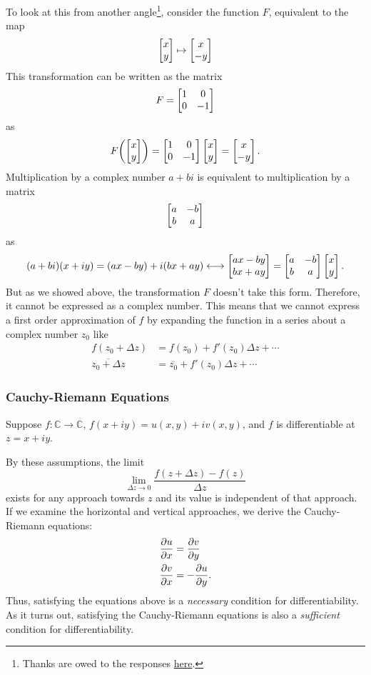 \documentclass[10pt]{scrartcl}
\numberwithin{equation}{subsection}
\theoremstyle{definition}
\theoremstyle{remark}
\newcommand{\Complex}{\mathbb{C}}
\newcommand*{\conjugate}[1]{\overline{#1}}
\begin{document}
To look at this from another angle\footnote{Thanks are
	owed to the responses
\href{http://math.stackexchange.com/questions/180849/why-is-the-complex-number-z-abi-equivalent-to-the-matrix-form-left-begins}{here}.},
consider the function
$F$, equivalent to the map
\[
	\bmqty{x \\ y} \mapsto \bmqty{x \\  -y} 
\] 
This transformation can be written as the matrix
\[
	F = \bmqty{1 & 0 \\ 0 & -1}
\]
as
\[
	F\pqty{\bmqty{x \\ y} }= \bmqty{1 & 0 \\ 0 & -1} \bmqty{x \\ y}  =
	\bmqty{x \\ -y}.
\]
Multiplication by a complex number $a + bi$ is equivalent
to multiplication by a matrix
\[
	\bmqty{a & -b \\ b & a}
\]
as
\[
	(a + bi) (x + iy) = (ax - by) + i(bx + ay) \longleftrightarrow
	\bmqty{ax - by \\ bx + ay} = \bmqty{a & -b \\ b & a} \bmqty{x \\ y}.
\]
But as we showed above, the transformation $F$ doesn't take this form.
Therefore, it cannot be expressed as a complex number. This means that we
cannot express a first order approximation of $f$ by expanding the function in a 
series about a complex number $z_0$ like
\begin{align*}
	f(z_0+\Delta z) &= f(z_0) + f'(z_0)\Delta z + \cdots \\	
	\conjugate{z_0 + \Delta z} &= \conjugate{z_0} + f'(z_0)\Delta z + \cdots
\end{align*}
\subsubsection{Cauchy-Riemann Equations}
Suppose $f:\Complex \to \Complex$, $f(x+iy) = u(x,y) + i v(x,y)$, 
and $f$ is differentiable at $z=x+iy$. 

By these assumptions, the limit
\[
\lim_{\Delta z \to 0} \frac{f(z+\Delta z) - f(z)}{\Delta z}
\] exists for any approach towards $z$ and its value is 
independent of that approach.
If we examine the horizontal and vertical approaches, 
we derive the Cauchy-Riemann equations:
\begin{align}
\pdv{u}{x} &= \pdv{v}{y}\\
\pdv{v}{x} &= -\pdv{u}{y}.
\end{align}
Thus, satisfying the equations above is a \emph{necessary} condition for
differentiability.  As it turns out, satisfying the Cauchy-Riemann equations
is also a \emph{sufficient} condition for differentiability.
\end{document}
